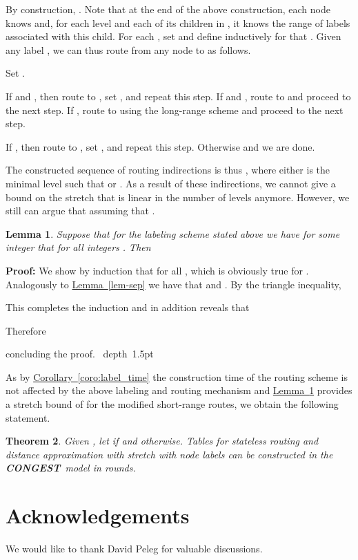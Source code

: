\documentclass[letterpaper,11pt]{article}
\newcommand{\namedref}[2]{\hyperref[#2]{#1~\ref*{#2}}}
\newcommand{\lemmaref}[1]{\namedref{Lemma}{#1}}
\newcommand{\corollaryref}[1]{\namedref{Corollary}{#1}}
\newtheorem{theorem}{Theorem}[section]
\newtheorem{lemma}[theorem]{Lemma}
\newcommand{\blackslug}{\hbox{\hskip 1pt \vrule width 4pt height 8pt
depth 1.5pt \hskip 1pt}}
\newcommand{\QED}{\quad\blackslug\lower 8.5pt\null\par}
\newenvironment{proof}[1][Proof:]{\noindent \textbf{#1}\xspace}{\QED}
\newcommand{\CONGEST}{\textbf{CONGEST}}
\begin{document}
By construction, . Note that at the end of the above
construction, each node  knows  and, for each level  and each
of its children in , it knows the range of labels associated
with this child. For each , set  and define inductively for
 that . Given any label
, we can thus route from any node  to  as follows.
\begin{compactenum}
\item Set .
\item If  and , then route to , set
, and repeat this step. If  and , route to
 and proceed to the next step. If , route to  using the
long-range scheme and proceed to the next step.
\item If , then route to , set , and repeat this step.
Otherwise  and we are done.
\end{compactenum}
The constructed sequence of routing indirections is thus
, where either  is the minimal
level such that  or . As a result of these
indirections, we cannot give a bound on the stretch that is linear in the
number of levels anymore. However, we still can argue that  assuming that .
\begin{lemma}\label{lem-stretch-unique}
Suppose that for the labeling scheme stated above we have for some integer
 that  for all integers .
Then

\end{lemma}
\begin{proof}
We show by induction that  for all , which is obviously true for . Analogously to \lemmaref{lem-sep} we
have that  and . By the triangle inequality,

This completes the induction and in addition reveals that

Therefore

concluding the proof.
\end{proof}
As by \corollaryref{coro:label_time} the construction time of the routing scheme 
is not affected by the above labeling and routing mechanism and
\lemmaref{lem-stretch-unique} provides a stretch bound of  for
the modified short-range routes, we obtain the following statement.
\begin{theorem}\label{theorem:routing-unique}
Given , let  if
 and  otherwise. Tables for
stateless routing and distance approximation with stretch  with node labels  can
be constructed in the \CONGEST\ model in  rounds.
\end{theorem}

\section*{Acknowledgements}
We would like to thank David Peleg for valuable discussions.



\end{document}
